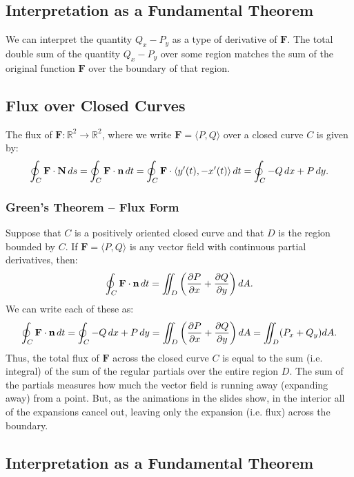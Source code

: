 \subsection{Interpretation as a Fundamental Theorem}

We can interpret the quantity \(Q_x - P_y\) as a type of derivative of \(\mathbf{F}\). The total double sum of the quantity \(Q_x - P_y\) over some region matches the sum of the original function \(\mathbf{F}\) over the boundary of that region. \\

\subsection{Flux over Closed Curves}

The flux of \(\mathbf{F} : \mathbb{R}^2 \to \mathbb{R}^2\), where we write \(\mathbf{F} = \langle P,Q \rangle\) over a closed curve \(C\) is given by:
\[
    \oint_C \mathbf{F} \cdot \mathbf{N} \, ds = \oint_C \mathbf{F} \cdot \mathbf{n} \, dt = \oint_C \mathbf{F} \cdot \langle y'(t), -x'(t) \rangle \, dt = \oint_C -Q \, dx + P \, dy.
\]

\subsubsection{Green's Theorem – Flux Form}

Suppose that \(C\) is a positively oriented closed curve and that \(D\) is the region bounded by \(C\). If \(\mathbf{F} = \langle P,Q \rangle\) is any vector field with continuous partial derivatives, then:
\[
    \oint_C \mathbf{F} \cdot \mathbf{n} \, dt = \iint_D \left( \frac{\partial P}{\partial x} + \frac{\partial Q}{\partial y} \right) dA.
\]
We can write each of these as:
\[
    \oint_C \mathbf{F} \cdot \mathbf{n} \, dt = \oint_C -Q \, dx + P \, dy = \iint_D \left( \frac{\partial P}{\partial x} + \frac{\partial Q}{\partial y} \right) dA = \iint_D (P_x + Q_y) dA.
\]
Thus, the total flux of \(\mathbf{F}\) across the closed curve \(C\) is equal to the sum (i.e. integral) of the sum of the regular partials over the entire region \(D\). The sum of the partials measures how much the vector field is running away (expanding away) from a point. But, as the animations in the slides show, in the interior all of the expansions cancel out, leaving only the expansion (i.e. flux) across the boundary.

\subsection{Interpretation as a Fundamental Theorem}

